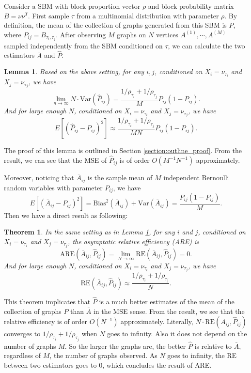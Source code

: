 \documentclass[a4paper]{article}
\newtheorem{lemma}[fact]{Lemma}
\newtheorem{theorem}[fact]{Theorem}
\begin{document}
Consider a SBM with block proportion vector $\rho$ and block probability matrix $B = \nu \nu^T$. First sample $\tau$ from a multinomial distribution with parameter $\rho$. By definition, the mean of the collection of graphs generated from this SBM is $P$, where $P_{ij} = B_{\tau_i, \tau_j}$. After observing $M$ graphs on $N$ vertices $A^{(1)}, \cdots, A^{(M)}$ sampled independently from the SBM conditioned on $\tau$, we can calculate the two estimators $\bar{A}$ and $\hat{P}$.

\begin{lemma}
\label{lm:VarPhat}
Based on the above setting, for any $i, j$, conditioned on $X_i = \nu_{\tau_i}$ and $X_j = \nu_{\tau_j}$, we have
\[
	\lim_{n \to \infty} N \cdot \mathrm{Var}(\hat{P}_{ij}) =
    \frac{1/\rho_{\tau_i} + 1/\rho_{\tau_j}}{M} P_{ij} (1 - P_{ij}).
\]
And for large enough $N$, conditioned on $X_i = \nu_{\tau_i}$ and $X_j = \nu_{\tau_j}$, we have
\[
	E[(\hat{P}_{ij} - P_{ij})^2] \approx
    \frac{1/\rho_{\tau_i} + 1/\rho_{\tau_j}}{M N} P_{ij}(1-P_{ij}).
\]
\end{lemma}

The proof of this lemma is outlined in Section \ref{section:outline_proof}. From the result, we can see that the MSE of $\hat{P}_{ij}$ is of order $O(M^{-1}N^{-1})$ approximately.

Moreover, noticing that $\bar{A}_{ij}$ is the sample mean of $M$ independent Bernoulli random variables with parameter $P_{ij}$, we have
\[
	E[(\bar{A}_{ij} - P_{ij})^2] = \mathrm{Bias}^2(\bar{A}_{ij}) + \mathrm{Var}(\bar{A}_{ij}) = \frac{P_{ij}(1-P_{ij})}{M}.
\]
Then we have a direct result as following:

\begin{theorem}
\label{thm:ARE}
In the same setting as in Lemma \ref{lm:VarPhat}, for any $i$ and $j$, conditioned on $X_i = \nu_{\tau_i}$ and $X_j = \nu_{\tau_j}$, the asymptotic relative efficiency (ARE) is 
\[
	\mathrm{ARE}(\bar{A}_{ij}, \hat{P}_{ij}) = \lim_{N \to \infty} \mathrm{RE}(\bar{A}_{ij}, \hat{P}_{ij}) = 0.
\]
And for large enough $N$, conditioned on $X_i = \nu_{\tau_i}$ and $X_j = \nu_{\tau_j}$, we have
\[
	\mathrm{RE}(\bar{A}_{ij}, \hat{P}_{ij}) \approx
    \frac{1/\rho_{\tau_i} + 1/\rho_{\tau_j}}{N}.
\]
\end{theorem}

This theorem implicates that $\hat{P}$ is a much better estimates of the mean of the collection of graphs $P$ than $\bar{A}$ in the MSE sense. From the result, we see that the relative efficiency is of order $O(N^{-1})$ approximately. Literally, $N \cdot \mathrm{RE}(\bar{A}_{ij}, \hat{P}_{ij})$ converges to $1/\rho_{\tau_i}+1/\rho_{\tau_j}$ when $N$ goes to infinity. Also it does not depend on the number of graphs $M$. So the larger the graphs are, the better $\hat{P}$ is relative to $\bar{A}$, regardless of $M$, the number of graphs observed. As $N$ goes to infinity, the RE between two estimators goes to 0, which concludes the result of ARE.
\end{document}
